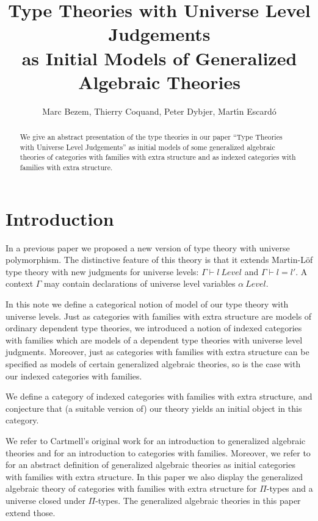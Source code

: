 \documentclass[11pt,a4paper]{article}
\theoremstyle{definition}
\begin{document}
\title{Type Theories with Universe Level Judgements\\
as Initial Models of Generalized Algebraic Theories}

\author{Marc Bezem, Thierry Coquand, Peter Dybjer, Mart\'{\i}n Escard\'o}
\date{}
\maketitle

\begin{abstract}
We give an abstract presentation of  the type theories in our paper
``Type Theories with Universe Level Judgements'' as initial models of some generalized algebraic theories of categories with families with extra structure and as indexed categories with families with extra structure.
\end{abstract}

\section{Introduction}

In a previous paper \cite{bcde:types21} we proposed a new version of type theory with universe polymorphism. The distinctive feature of this theory is that it extends Martin-Löf type theory with new judgments for universe levels:
$
\Gamma \vdash l\ Level
$
and 
$
\Gamma \vdash l = l'.
$
A context $\Gamma$ may contain declarations of universe level variables $\alpha\ Level$. 

In this note we define a categorical notion of model of our type theory with universe levels. Just as categories with families with extra structure are models of ordinary dependent type theories, we introduced a notion of indexed categories with families which are models of a dependent type theories with universe level judgments. Moreover, just as categories with families with extra structure can be specified as models of certain generalized algebraic theories, so is the case with our indexed categories with families.

We define a category of indexed categories with families with extra structure, and conjecture that (a suitable version of) our theory \cite{bcde} yields an initial object in this category.

We refer to Cartmell's original work \cite{cartmell:phd,cartmell:contextual} for an introduction to generalized algebraic theories and \cite{dybjer:internal} for an introduction to categories with families. Moreover, we refer to \cite{bcde:hofmann} for an abstract definition of generalized algebraic theories as initial categories with families with extra structure. In this paper we also display the generalized algebraic theory of categories with families with extra structure for $\Pi$-types and a universe closed under $\Pi$-types. The generalized algebraic theories in this paper extend those.
\end{document}
